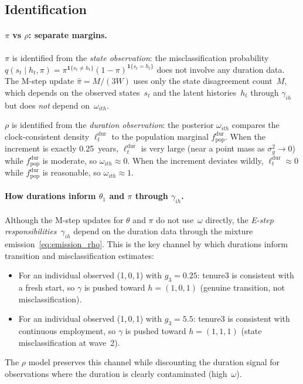 \documentclass[12pt]{article}
\begin{document}
\subsection{Identification}
\label{sec:identification_rho}

\paragraph{\(\pi\) vs \(\rho\): separate margins.}
\(\pi\) is identified from the \emph{state observation}: the misclassification probability \(q(s_t \mid h_t, \pi) = \pi^{\mathbf{1}\{s_t \neq h_t\}}\!(1 - \pi)^{\mathbf{1}\{s_t = h_t\}}\) does not involve any duration data. The M-step update \(\hat{\pi} = M / (3W)\) uses only the state disagreement count~\(M\), which depends on the observed states~\(s_t\) and the latent histories~\(h_t\) through \(\gamma_{ih}\) but does \emph{not} depend on~\(\omega_{ith}\).

\(\rho\) is identified from the \emph{duration observation}: the posterior \(\omega_{ith}\) compares the clock-consistent density \(\ell^{\mathrm{dur}}_t\) to the population marginal \(f^{\mathrm{dur}}_{\mathrm{pop}}\). When the increment is exactly 0.25~years, \(\ell^{\mathrm{dur}}_t\) is very large (near a point mass as \(\sigma^2_g \to 0\)) while \(f^{\mathrm{dur}}_{\mathrm{pop}}\) is moderate, so \(\omega_{ith} \approx 0\). When the increment deviates wildly, \(\ell^{\mathrm{dur}}_t \approx 0\) while \(f^{\mathrm{dur}}_{\mathrm{pop}}\) is reasonable, so \(\omega_{ith} \approx 1\).

\paragraph{How durations inform \(\theta_1\) and \(\pi\) through \(\gamma_{ih}\).}
Although the M-step updates for \(\theta\) and \(\pi\) do not use~\(\omega\) directly, the \emph{E-step responsibilities}~\(\gamma_{ih}\) depend on the duration data through the mixture emission~\eqref{eq:emission_rho}. This is the key channel by which durations inform transition and misclassification estimates:
\begin{itemize}
\item For an individual observed (1,\,0,\,1) with \(g_3 = 0.25\): tenure3 is consistent with a fresh start, so \(\gamma\) is pushed toward \(h = (1,0,1)\) (genuine transition, not misclassification).
\item For an individual observed (1,\,0,\,1) with \(g_3 = 5.5\): tenure3 is consistent with continuous employment, so \(\gamma\) is pushed toward \(h = (1,1,1)\) (state misclassification at wave~2).
\end{itemize}
The \(\rho\) model preserves this channel while discounting the duration signal for observations where the duration is clearly contaminated (high~\(\omega\)).
\end{document}
